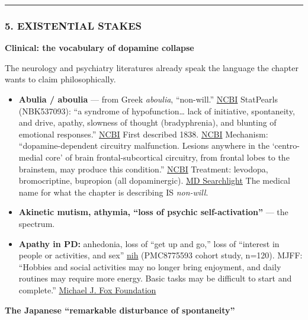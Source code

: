 \begin{center}\rule{0.5\linewidth}{0.5pt}\end{center}

\subsubsection{5. EXISTENTIAL STAKES}\label{07_pleasure_and_self-existential-stakes}

\textbf{Clinical: the vocabulary of dopamine collapse}

The neurology and psychiatry literatures already speak the language the chapter wants to claim philosophically.

\begin{itemize}
\tightlist
\item
  \textbf{Abulia / aboulia} --- from Greek \emph{aboulia}, ``non-will.'' \href{https://www.ncbi.nlm.nih.gov/sites/books/NBK537093/}{NCBI} StatPearls (NBK537093): ``a syndrome of hypofunction\ldots{} lack of initiative, spontaneity, and drive, apathy, slowness of thought (bradyphrenia), and blunting of emotional responses.'' \href{https://www.ncbi.nlm.nih.gov/sites/books/NBK537093/}{NCBI} First described 1838. \href{https://www.ncbi.nlm.nih.gov/sites/books/NBK537093/}{NCBI} Mechanism: ``dopamine-dependent circuitry malfunction. Lesions anywhere in the `centro-medial core' of brain frontal-subcortical circuitry, from frontal lobes to the brainstem, may produce this condition.'' \href{https://www.ncbi.nlm.nih.gov/sites/books/NBK537093/}{NCBI} Treatment: levodopa, bromocriptine, bupropion (all dopaminergic). \href{https://mdsearchlight.com/neurology/abulia/}{MD Searchlight} The medical name for what the chapter is describing IS \emph{non-will}.
\item
  \textbf{Akinetic mutism, athymia, ``loss of psychic self-activation''} --- the spectrum.
\item
  \textbf{Apathy in PD:} anhedonia, loss of ``get up and go,'' loss of ``interest in people or activities, and sex'' \href{https://www.ncbi.nlm.nih.gov/pmc/articles/PMC8775593/}{nih} (PMC8775593 cohort study, n=120). MJFF: ``Hobbies and social activities may no longer bring enjoyment, and daily routines may require more energy. Basic tasks may be difficult to start and complete.'' \href{https://www.michaeljfox.org/news/ask-md-apathy-and-parkinsons-disease}{Michael J. Fox Foundation}
\end{itemize}

\textbf{The Japanese ``remarkable disturbance of spontaneity''}

